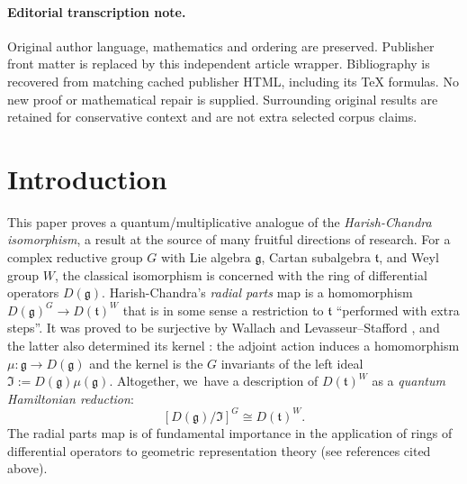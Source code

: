 \documentclass[11pt]{article}
\theoremstyle{definition}
\begin{document}
\paragraph{Editorial transcription note.}
Original author language, mathematics and ordering are preserved. Publisher front matter is replaced by this independent article wrapper. Bibliography is recovered from matching cached publisher HTML, including its TeX formulas. No new proof or mathematical repair is supplied. Surrounding original results are retained for conservative context and are not extra selected corpus claims.
\clearpage

\section{Introduction}
This paper proves a quantum/multiplicative analogue of the \textit{Harish-Chandra isomorphism}, a result at the source of many fruitful directions of research.
For a complex reductive group $G$ with Lie algebra $\mathfrak{g}$, Cartan subalgebra $\mathfrak{t}$, and Weyl group $W$, the classical isomorphism is concerned with the ring of differential operators $D(\mathfrak{g})$.
Harish-Chandra's \textit{radial parts} map \cite{HCInvDiff} is a homomorphism $D(\mathfrak{g})^G\to D(\mathfrak{t})^W$ that is in some sense a restriction to $\mathfrak{t}$ ``performed with extra steps''.
It was proved to be surjective by Wallach \cite{WallachInv} and Levasseur--Stafford \cite{LevStafJams}, and the latter also determined its kernel \cite{LevStafKer}: the adjoint action induces a homomorphism $\mu:\mathfrak{g}\to D(\mathfrak{g})$ and the kernel is the $G$ invariants of the left ideal $\mathfrak{I}:= D(\mathfrak{g})\mu(\mathfrak{g})$.
Altogether, we~have a description of $D(\mathfrak{t})^W$ as a \textit{quantum Hamiltonian reduction}:
\[
\left[ D(\mathfrak{g})\big/\mathfrak{I} \right]^G\cong D(\mathfrak{t})^W.
\]
The radial parts map is of fundamental importance in the application of rings of differential operators to geometric representation theory (see references cited above).
\end{document}
